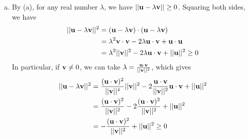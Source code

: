 \documentclass[12pt,letterpaper,reqno]{article}
\numberwithin{equation}{section}
\begin{document}
\begin{pf}
	\begin{enumerate}[(a)]
			\item By (a), for any real number $\lambda$, we have $||{\bf u}-\lambda{\bf v}|| \geq 0$. Squaring both sides, we have
	\begin{align*}
		||{\bf u}-\lambda{\bf v}||^2&=({\bf u}-\lambda{\bf v})\cdot ({\bf u}-\lambda{\bf v}) \\
		&=\lambda^2{\bf v}\cdot {\bf v}-2\lambda {\bf u}\cdot {\bf v}+{\bf u}\cdot {\bf u} \\
		&=\lambda^2||{\bf v}||^2-2\lambda{\bf u}\cdot {\bf v}+||{\bf u}||^2 \geq 0
	\end{align*} 
In particular, if ${\bf v} \neq 0$, we can take $\lambda=\frac{{\bf u}\cdot {\bf v}}{||{\bf v}||^2}$, which gives
\begin{align*}
	||{\bf u}-\lambda{\bf v}||^2&=\frac{({\bf u}\cdot {\bf v})^2}{||{\bf v}||^4}||{\bf v}||^2-2\frac{{\bf u}\cdot {\bf v}}{||{\bf v}||^2}{\bf u}\cdot {\bf v}+||{\bf u}||^2 \\
	&=\frac{({\bf u}\cdot {\bf v})^2}{||{\bf v}||^2}-2\frac{({\bf u}\cdot {\bf v})^2}{||{\bf v}||^2}+||{\bf u}||^2 \\
	&=-\frac{({\bf u}\cdot {\bf v})^2}{||{\bf v}||^2}+||{\bf u}||^2 \geq 0\\
\end{align*}


\end{enumerate}
\end{pf}
\end{document}

